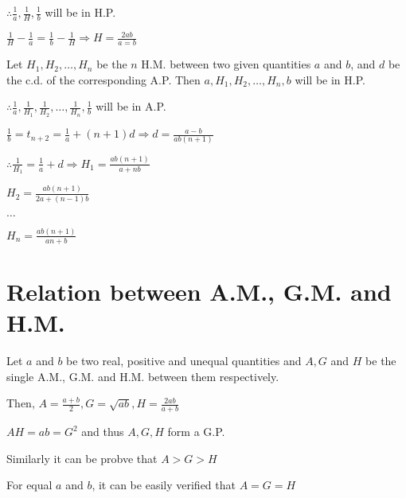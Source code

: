 $\therefore \frac{1}{a}, \frac{1}{H}, \frac{1}{b}$ will be in H.P.

$\frac{1}{H} - \frac{1}{a} = \frac{1}{b} - \frac{1}{H} \Rightarrow H = \frac{2ab}{a =b}$

Let $H_1, H_2, \ldots, H_n$ be the $n$ H.M. between two given quantities $a$ and $b$, and $d$ be the c.d. of the corresponding A.P.
Then $a, H_1, H_2, \ldots, H_n, b$ will be in H.P.

$\therefore \frac{1}{a}, \frac{1}{H_1}, \frac{1}{H_2}, \ldots, \frac{1}{H_n}, \frac{1}{b}$ will be in A.P.

$\frac{1}{b} = t_{n + 2} = \frac{1}{a} + (n + 1)d \Rightarrow d = \frac{a - b}{ab(n + 1)}$

$\therefore \frac{1}{H_1} = \frac{1}{a} + d \Rightarrow H_1 = \frac{ab(n + 1)}{a + nb}$

$H_2 = \frac{ab(n + 1)}{2a + (n - 1)b}$

$\ldots$

$H_n = \frac{ab(n + 1)}{an + b}$

\section{Relation between A.M., G.M. and H.M.}
Let $a$ and $b$ be two real, positive and unequal quantities and $A, G$ and $H$ be the single A.M., G.M. and H.M. between them
respectively.

Then, $A = \frac{a + b}{2}, G = \sqrt{ab}, H = \frac{2ab}{a + b}$

$AH = ab = G^2$ and thus $A, G, H$ form a G.P.

Similarly it can be probve that $A > G > H$

For equal $a$ and $b$, it can be easily verified that $A = G = H$

